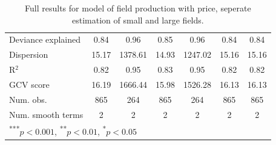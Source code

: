 \documentclass[11pt]{article}
\begin{document}
\begin{spacing}{1}
\begin{table}
\begin{center}
\begin{tabular}{l c c c c c c }
Deviance explained                   & 0.84          & 0.96          & 0.85          & 0.96          & 0.84          & 0.84          \\
Dispersion                           & 15.17         & 1378.61       & 14.93         & 1247.02       & 15.16         & 15.16         \\
R$^2$                                & 0.82          & 0.95          & 0.83          & 0.95          & 0.82          & 0.82          \\
GCV score                            & 16.19         & 1666.44       & 15.98         & 1526.28       & 16.13         & 16.13         \\
Num. obs.                            & 865           & 264           & 865           & 264           & 865           & 865           \\
Num. smooth terms                    & 2             & 2             & 2             & 2             & 2             & 2             \\
\hline
\multicolumn{7}{l}{\scriptsize{\textsuperscript{***}$p<0.001$, 
  \textsuperscript{**}$p<0.01$, 
  \textsuperscript{*}$p<0.05$}}
\end{tabular}
\caption{Full results for model of field production with price, seperate estimation of small and large fields.}
\label{table:unpooled}
\end{center}
\end{table}




\end{spacing}
\end{document}
